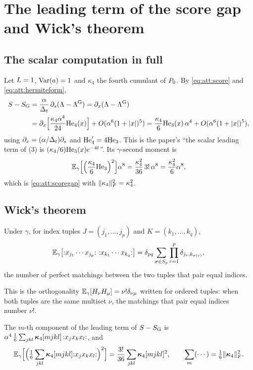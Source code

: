 \section{The leading term of the score gap and Wick's theorem}
\label{sec:att:wick}

\subsection{The scalar computation in full}

Let $L=1$, $\operatorname{Var}(a)=1$ and $\kappa_4$ the fourth cumulant of $P_0$. By
\cref{eq:att:score} and \cref{eq:att:hermiteform},
\begin{align*}
  S-S_{\mathrm{G}}&=\frac{\alpha}{\Delta_t}\,\partial_s(\Lambda-\Lambda^{\mathrm G})
  =\partial_x(\Lambda-\Lambda^{\mathrm G})\\
  &=\partial_x\Bigl[\frac{\kappa_4\alpha^4}{24}\mathrm{He}_{4}(x)\Bigr]+O(\alpha^6(1+|x|)^5)
  =\frac{\kappa_4}{6}\mathrm{He}_{3}(x)\,\alpha^4+O(\alpha^6(1+|x|)^5),
\end{align*}
using $\partial_x=(\alpha/\Delta_t)\partial_s$ and $\mathrm{He}_{4}'=4\mathrm{He}_{3}$. This is the paper's
``the scalar leading term of (3) is $(\kappa_4/6)\mathrm{He}_{3}(x)e^{-4t}$''. Its
$\gamma$-second moment is
\[
  \mathbb{E}_\gamma\Bigl[\Bigl(\frac{\kappa_4}6\mathrm{He}_{3}\Bigr)^2\Bigr]\alpha^8=\frac{\kappa_4^2}{36}\,3!\,\alpha^8=\frac{\kappa_4^2}{6}\alpha^8,
\]
which is \cref{eq:att:scoregap} with $\lVert \kappa_4 \rVert_{F}^2=\kappa_4^2$.

\subsection{Wick's theorem}

\begin{theorem}[Wick]
\label{thm:att:wick}
Under $\gamma$, for index tuples $J=(j_1,\dots,j_p)$ and $K=(k_1,\dots,k_q)$,
\[
  \E_\gamma\bigl[{:}x_{j_1}\cdots x_{j_p}{:}\ {:}x_{k_1}\cdots x_{k_q}{:}\bigr]
  =\delta_{pq}\sum_{\sigma\in S_p}\prod_{r=1}^{p}\delta_{j_r,k_{\sigma(r)}},
\]
the number of perfect matchings between the two tuples that pair equal indices.
\end{theorem}

This is the orthogonality $\mathbb{E}_\gamma[H_\nu H_\mu]=\nu!\delta_{\nu\mu}$ written for
ordered tuples: when both tuples are the same multiset $\nu$, the matchings that pair
equal indices number $\nu!$.

\begin{proposition}
\label{prop:att:c4}
The $m$-th component of the leading term of $S-S_{\mathrm{G}}$ is
$\alpha^4\,\tfrac16\sum_{jkl}\bm{\kappa}_4[mjkl]\,{:}x_jx_kx_l{:}$, and
\[
  \mathbb{E}_\gamma\Bigl[\Bigl(\tfrac16\sum_{jkl}\bm{\kappa}_4[mjkl]{:}x_jx_kx_l{:}\Bigr)^2\Bigr]=\frac{3!}{36}\sum_{jkl}\bm{\kappa}_4[mjkl]^2,
  \qquad
  \sum_m(\cdots)=\tfrac16\lVert \bm{\kappa}_4 \rVert_{F}^2 .
\]
\end{proposition}

